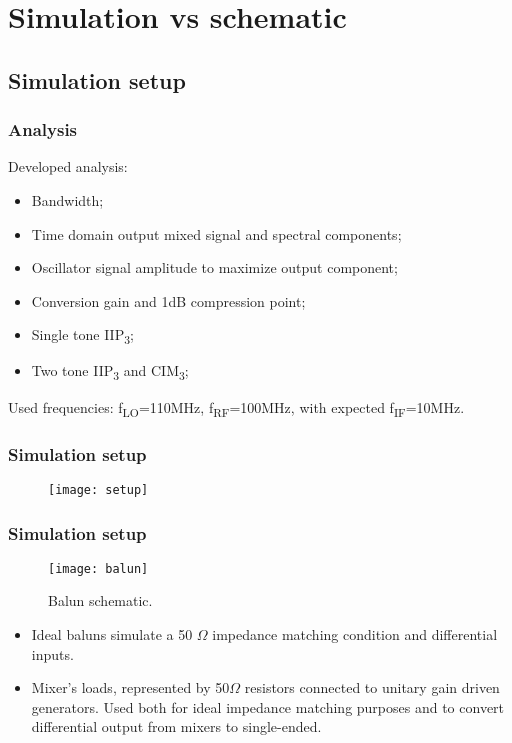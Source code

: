 \section{Simulation vs schematic}
\subsection{Simulation setup}

\begin{frame}
	\tableofcontents[currentsubsection]
\end{frame}

\begin{frame}
\frametitle{Analysis}
	Developed analysis:
	\begin{itemize}
		\item Bandwidth;
		\item Time domain output mixed signal and spectral components;
			\item Oscillator signal amplitude to maximize output component;
		\item Conversion gain and 1dB compression point;
		\item Single tone IIP\textsubscript{3};
		\item Two tone IIP\textsubscript{3} and CIM\textsubscript{3};
	\end{itemize}
	Used frequencies: f\textsubscript{LO}=110MHz, f\textsubscript{RF}=100MHz, with expected f\textsubscript{IF}=10MHz.
\end{frame}

\begin{frame}
	\frametitle{Simulation setup}
	\begin{figure}[H]
		\centering
		\texttt{[image: setup]}
		\label{fig:setup}
	\end{figure}
\end{frame}

\begin{frame}
	\frametitle{Simulation setup}
	\begin{figure}[H]
		\centering
		\texttt{[image: balun]}
		\caption{Balun schematic.}
		\label{fig:balun}
	\end{figure}
	\begin{itemize}
		\item Ideal baluns simulate a  50 \(\Omega\) impedance matching condition and differential inputs. 
		\item Mixer's loads, represented by 50\(\Omega\) resistors connected to unitary gain driven generators. Used both for ideal impedance matching purposes and to convert differential output from mixers to single-ended.
	\end{itemize}
\end{frame}

